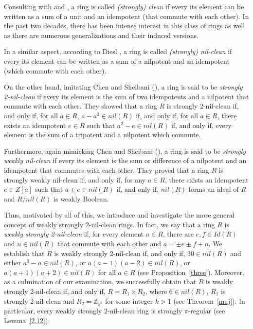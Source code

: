\documentclass[12pt]{amsart}
\theoremstyle{definition}
\begin{document}
Consulting with \cite{16} and \cite{17}, a ring is called {\it (strongly) clean} if every its element can be written as a sum of a unit and an idempotent (that commute with each other). In the past two decades, there has been intense interest in this class of rings as well as there are numerous generalizations and their induced versions.

In a similar aspect, according to Diesl \cite{2}, a ring is called {\it (strongly) nil-clean} if every its element can be written as a sum of a nilpotent and an idempotent (which commute with each other).

On the other hand, imitating Chen and Sheibani (\cite{chen}), a ring is said to be {\it strongly 2-nil-clean} if every its element is the sum of two idempotents and a nilpotent that commute with each other. They showed that a ring $R$ is strongly 2-nil-clean if, and only if, for all $a \in R$, $a - a^3 \in nil(R)$ if, and only if, for all $a \in R$, there exists an idempotent $e\in R$ such that $a^2 -e\in nil(R)$ if, and only if, every element is the sum of a tripotent and a nilpotent which commute.

Furthermore, again mimicking Chen and Sheibani (\cite{chen2}), a ring is said to be {\it strongly weakly nil-clean} if every its element is the sum or difference of a nilpotent and an idempotent that commutes with each other. They  proved that a ring $R$ is strongly weakly nil-clean if, and only if, for any $a\in R$, there exists an idempotent $e\in Z[a]$ such that $a\pm e \in nil(R)$ if, and only if, $nil(R)$ forms an ideal of $R$ and $R/nil(R)$ is weakly Boolean.

Thus, motivated by all of this, we introduce and investigate the more general concept of weakly strongly 2-nil-clean rings. In fact, we say that a ring $R$ is {\it weakly strongly 2-nil-clean} if, for every element $a\in R$, there are $e,f\in Id(R)$ and $n\in nil(R)$ that commute with each other and $a=\pm e\pm f+n$. We establish that $R$ is weakly strongly 2-nil-clean if, and only if, $30\in nil(R)$ and either $a^3-a\in nil(R)$, or $a(a-1)(a-2)\in nil(R)$, or $a(a+1)(a+2)\in nil(R)$ for all $a\in R$ (see Proposition~\ref{three}). Moreover, as a culmination of our examination, we successfully obtain that $R$ is weakly strongly 2-nil-clean if, and only if, $R=R_1\times  R_2$, where $6\in nil(R)$, $R_1$ is strongly 2-nil-clean and $R_2=\mathbb{Z}_{5^k}$ for some integer $k>1$ (see Theorem~\ref{maj}). In particular, every weakly strongly 2-nil-clean ring is strongly $\pi$-regular (see Lemma~\ref{2.12}).
\end{document}
